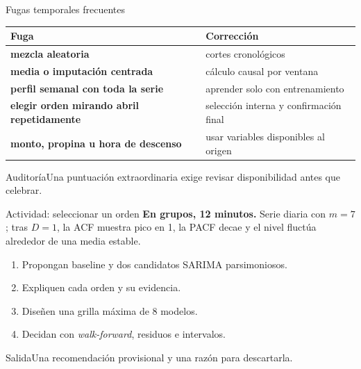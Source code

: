 \documentclass[aspectratio=169,10pt]{beamer}
\begin{document}
\begin{frame}{Fugas temporales frecuentes}\scriptsize
\begin{tabularx}{\textwidth}{>{\bfseries}p{}X}\toprule Fuga & Corrección\\\midrule mezcla aleatoria & cortes cronológicos\\ media o imputación centrada & cálculo causal por ventana\\ perfil semanal con toda la serie & aprender solo con entrenamiento\\ elegir orden mirando abril repetidamente & selección interna y confirmación final\\ monto, propina u hora de descenso & usar variables disponibles al origen\\\bottomrule\end{tabularx}
\begin{alertblock}{Auditoría}Una puntuación extraordinaria exige revisar disponibilidad antes que celebrar.\end{alertblock}
\end{frame}

\begin{frame}{Actividad: seleccionar un orden}\small
\textbf{En grupos, 12 minutos.} Serie diaria con $m=7$; tras $D=1$, la ACF muestra pico en 1, la PACF decae y el nivel fluctúa alrededor de una media estable.
\begin{enumerate}\item Propongan baseline y dos candidatos SARIMA parsimoniosos.\item Expliquen cada orden y su evidencia.\item Diseñen una grilla máxima de 8 modelos.\item Decidan con \textit{walk-forward}, residuos e intervalos.\end{enumerate}
\begin{block}{Salida}Una recomendación provisional y una razón para descartarla.\end{block}
\end{frame}
\end{document}
